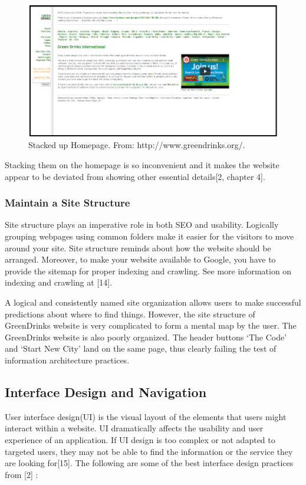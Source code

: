 \documentclass[12pt]{article}
\begin{document}
\begin{figure}[ht]
\centering
\includegraphics[width=1.0\textwidth]{f2}
\caption[Stacked up Homepage]{Stacked up Homepage. From: http://www.greendrinks.org/\footnotemark.}
\end{figure}

Stacking them on the homepage is so inconvenient and it makes the website appear to be deviated from showing other essential details[2, chapter 4].

 \subsubsection*{Maintain a Site Structure}
Site structure plays an imperative role in both SEO and usability.  Logically grouping webpages using common folders make it easier for the visitors to move around your site. Site structure reminds about how the website should be arranged.  Moreover, to make your website available to Google, you have to provide the sitemap for proper indexing and crawling. See more information on indexing and crawling at [14].

A logical and consistently named site organization allows users to make successful predictions about where to find things. However, the site structure of  GreenDrinks website is very complicated to form a mental map by the user. The GreenDrinks website is also poorly organized. The header buttons ‘The Code’ and ‘Start New City’ land on the same page, thus clearly failing the test of information architecture practices.

\subsection*{Interface Design and Navigation}
User interface design(UI) is the visual layout of the elements that users might interact within a website.  UI dramatically affects the usability and user experience of an application.  If UI design is too complex or not adapted to targeted users, they may not be able to find the information or the service they are looking for[15]. The following are some of the best  interface design practices from [2] : 
\end{document}
